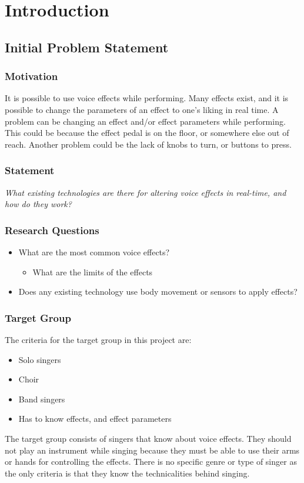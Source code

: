 \chapter{Introduction}\label{ch:Intro}

\section{Initial Problem Statement}

\subsection{Motivation}

It is possible to use voice effects while performing. Many effects exist, and it is possible to change the parameters of an effect to one's liking in real time. 
A problem can be changing an effect and/or effect parameters while performing. This could be because the effect pedal is on the floor, or somewhere else out of reach. Another problem could be the lack of knobs to turn, or buttons to press.

\subsection{Statement}

\textit{What existing technologies are there for altering voice effects in real-time, and how do they work?}


\subsection{Research Questions}\label{sub:ResearchQ}

\begin{itemize}
	\item What are the most common voice effects?
	\begin{itemize}
		\item What are the limits of the effects
	\end{itemize}
	\item Does any existing technology use body movement or sensors to apply effects?
\end{itemize}

\subsection{Target Group}
The criteria for the target group in this project are:

\begin{itemize}
	\item Solo singers
	\item Choir
	\item Band singers
	\item Has to know effects, and effect parameters
\end{itemize}

The target group consists of singers that know about voice effects. They should not play an instrument while singing because they must be able to use their arms or hands for controlling the effects. There is no specific genre or type of singer as the only criteria is that they know the technicalities behind singing.

